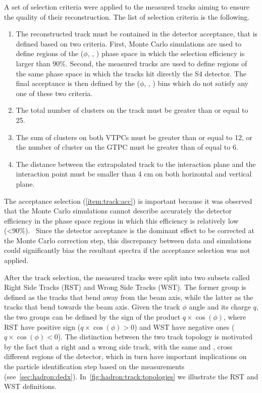 A set of selection criteria were
applied to the measured tracks aiming to
ensure the quality of their reconstruction. 
The list of selection criteria is the following.
\begin{enumerate}[label=(\roman*)]
\item The reconstructed track must be contained in the detector acceptance,
  that is defined based on two criteria. First,
  Monte Carlo simulations are used to define regions of the ($\phi$, \pp, \pT)
  phase space in which the selection efficiency is larger than 90\%. Second,
  the measured tracks are used to define regions of the same phase space in
  which the tracks hit directly the S4 detector. The final acceptance is then defined
  by the ($\phi$, \pp, \pT) bins which do not satisfy any one of
  these two criteria.~\cite{MartinThesis} \label{item:track:acc} 
\item The total number of clusters on the track must be greater than or equal to 25.
\item The sum of clusters on both VTPCs must be greater than or equal to 12, or
  the number of cluster on the GTPC must be greater than of equal to 6.
\item The distance between the extrapolated track to the interaction plane and the
  interaction point must be smaller than 4 cm on both horizontal and vertical plane.
\end{enumerate}

The acceptance selection (\cref{item:track:acc}) is important because
it was observed that the Monte Carlo simulations cannot describe
accurately the detector efficiency in the phase space regions
in which this efficiency is relatively low (<90\%).~\cite{MartinThesis}
Since the detector acceptance is the dominant effect to be corrected at the Monte Carlo
correction step, this discrepancy between data and simulations
could significantly bias the resultant spectra if the acceptance selection
was not applied.

After the track selection, the measured tracks were split
into two subsets called Right Side Tracks (RST) and Wrong Side Tracks (WST).
The former group is defined as the tracks that bend away from the
beam axis, while the latter as the tracks that bend towards the beam axis.
Given the track $\phi$ angle and its charge $q$, the two groups
can be defined by the sign of the product $q \times \cos(\phi)$, where
RST have positive sign ($q \times \cos(\phi)>0$)
and WST have negative ones ($q \times \cos(\phi)<0$).
The distinction between the two track topology is motivated by the
fact that a right and a wrong side track, with the same \pp and
\pT, cross different regions of the detector, 
which in turn have important implications on the
particle identification step based on the \dedx measurements
(see~\cref{sec:hadron:dedx}). 
In~\cref{fig:hadron:track:topologies} we illustrate the
RST and WST definitions.

